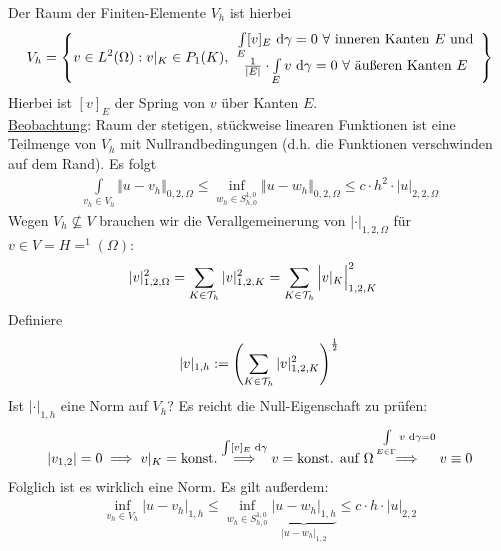 Der Raum der Finiten-Elemente $V_h$ ist hierbei
\begin{align*}
V_h=\left\lbrace v\in L^2(\Omega):
v|_K\in P_1(K),
\begin{array}{c}
\int\limits_E [v]_E\text{ d}\gamma=0~\forall
\text{ inneren Kanten $E$ und}\\
\frac{1}{|E|}\cdot\int\limits_E v\text{ d}\gamma=0~\forall\text{ äußeren Kanten }E
\end{array}
\right\rbrace
\end{align*}
Hierbei ist $[v]_E$ der Spring von $v$ über Kanten $E$.\\
\ul{Beobachtung}: Raum der stetigen, stückweise linearen Funktionen ist eine Teilmenge von $V_h$ mit Nullrandbedingungen (d.h. die Funktionen verschwinden auf dem Rand). Es folgt
\begin{align*}
\int\limits_{v_h\in V_h}\big\Vert u-v_h\big\Vert_{0,2,\Omega}
\leq\inf\limits_{w_h\in S_{h,0}^{1,0}}\big\Vert u-w_h\big\Vert_{0,2,\Omega}
\leq c\cdot h^2\cdot|u|_{2,2,\Omega}
\end{align*}
Wegen $V_h\not\subseteq V$ brauchen wir die Verallgemeinerung von $|\cdot|_{1,2,\Omega}$ für $v\in V=H=^1(\Omega)$:
\begin{align*}
|v|_{1,2,\Omega}^2
&=\sum\limits_{K\in\mathcal{T}_h}|v|^2_{1,2,K}
=\sum\limits_{K\in\mathcal{T}_h}\Big| v|_K\Big|^2_{1,2,K}
\end{align*}
Definiere
\begin{align*}
|v|_{1,h}:=\left(\sum\limits_{K\in\mathcal{T}_h}|v|^2_{1,2,K}\right)^{\frac{1}{2}}
\end{align*}
Ist $|\cdot|_{1,h}$ eine Norm auf $V_h$? Es reicht die Null-Eigenschaft zu prüfen:
\begin{align*}
|v_{1,2}|=0\implies v|_K=\text{konst.}
\stackrel{\int[v]_E\text{ d}\gamma}{\implies} 
v=\text{konst. auf }\Omega
\stackrel{\int\limits_{E\in\Gamma} v\text{ d}\gamma=0}{\implies}
v\equiv 0
\end{align*}
Folglich ist es wirklich eine Norm. Es gilt außerdem:
\begin{align*}
\inf\limits_{v_h\in V_h}\big|u-v_h\big|_{1,h}
\leq\inf\limits_{w_h\in S_{h,0}^{1,0}}\underbrace{\big|u-w_h\big|_{1,h}}_{|u-w_h|_{1,2}}
\leq c\cdot h\cdot|u|_{2,2}
\end{align*}

